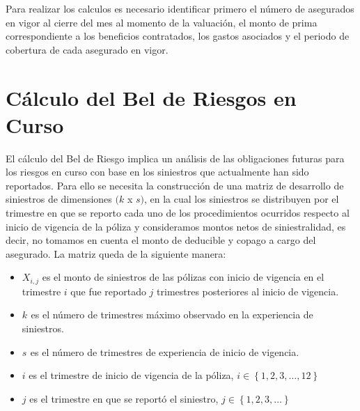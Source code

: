 \documentclass[11pt,twoside,openright,spanish]{report}
\numberwithin{equation}{chapter}
\numberwithin{figure}{chapter}
\numberwithin{table}{chapter}
\begin{document}
	Para realizar los calculos es necesario identificar primero el número de asegurados en vigor al cierre del mes al momento de la valuación, el monto de prima correspondiente a los beneficios contratados, los gastos asociados y el periodo de cobertura de cada asegurado en vigor.
		
	\section{Cálculo del Bel de Riesgos en Curso}

	El cálculo del Bel de Riesgo implica un análisis de las obligaciones futuras para los riesgos en curso con base en los siniestros que actualmente han sido reportados. Para ello se necesita la construcción de una matriz de desarrollo de siniestros  de dimensiones $(k$ x $s)$, en la cual los siniestros se distribuyen por el trimestre en que se reporto cada uno de los procedimientos ocurridos respecto al inicio de vigencia de la póliza y consideramos montos netos de siniestralidad, es decir, no tomamos en cuenta el monto de deducible y copago a cargo del asegurado. La matriz queda de la siguiente manera:

	\vspace{0.1cm}
	
	\begin{itemize}
		\setlength\itemsep{-0.5em}
		\item ${X}_{i,j}$ es el monto de siniestros de las pólizas con inicio de vigencia en el trimestre $i$ que fue reportado $j$ trimestres posteriores al inicio de vigencia.
		\item ${k}_{}$ es el número de trimestres máximo observado en la experiencia de siniestros.
		\item ${s}_{}$ es el número de trimestres de experiencia de inicio de vigencia.
		\item $i$ es el trimestre de inicio de vigencia de la póliza, $i\in \left\{1,2,3,\dots ,12\right\}$
		\item $j$ es el trimestre en que se reportó el siniestro,  $j\in \left\{1,2,3,\dots\right\}$
	\end{itemize}
	
	\vspace{1cm}
\end{document}

